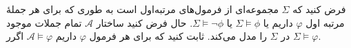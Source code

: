 فرض کنید که 
  $\Sigma$
  مجموعه‌ای از فرمول‌های مرتبه‌اول است به طوری که برای هر جملهٔ مرتبه اول 
  $\varphi$
  داریم یا
  $\Sigma\models\phi$
  یا
  $\Sigma\models\neg\phi$.
  حال فرض کنید ساختار 
  $\mathcal{A}$
  تمام جملات موجود در 
  $\Sigma$
  را مدل می‌کند. ثابت کنید که برای هر فرمول 
  $\varphi$
  داریم
  $\mathcal{A}\models\varphi$
  اگرر
  $\Sigma\models\varphi$.